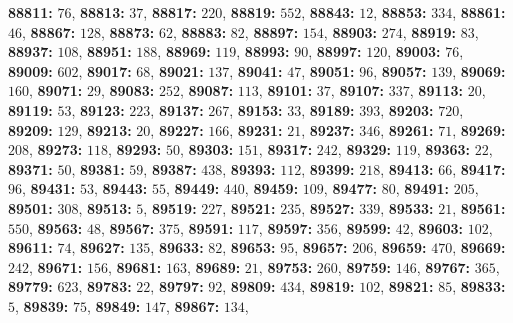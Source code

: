 \textsf{\bfseries 88811:} $76$, \textsf{\bfseries 88813:} $37$, \textsf{\bfseries 88817:} $220$, \textsf{\bfseries 88819:} $552$, \textsf{\bfseries 88843:} $12$, \textsf{\bfseries 88853:} $334$, \textsf{\bfseries 88861:} $46$, \textsf{\bfseries 88867:} $128$, \textsf{\bfseries 88873:} $62$, \textsf{\bfseries 88883:} $82$, \textsf{\bfseries 88897:} $154$, \textsf{\bfseries 88903:} $274$, \textsf{\bfseries 88919:} $83$, \textsf{\bfseries 88937:} $108$, \textsf{\bfseries 88951:} $188$, \textsf{\bfseries 88969:} $119$, \textsf{\bfseries 88993:} $90$, \textsf{\bfseries 88997:} $120$, \textsf{\bfseries 89003:} $76$, \textsf{\bfseries 89009:} $602$, \textsf{\bfseries 89017:} $68$, \textsf{\bfseries 89021:} $137$, \textsf{\bfseries 89041:} $47$, \textsf{\bfseries 89051:} $96$, \textsf{\bfseries 89057:} $139$, \textsf{\bfseries 89069:} $160$, \textsf{\bfseries 89071:} $29$, \textsf{\bfseries 89083:} $252$, \textsf{\bfseries 89087:} $113$, \textsf{\bfseries 89101:} $37$, \textsf{\bfseries 89107:} $337$, \textsf{\bfseries 89113:} $20$, \textsf{\bfseries 89119:} $53$, \textsf{\bfseries 89123:} $223$, \textsf{\bfseries 89137:} $267$, \textsf{\bfseries 89153:} $33$, \textsf{\bfseries 89189:} $393$, \textsf{\bfseries 89203:} $720$, \textsf{\bfseries 89209:} $129$, \textsf{\bfseries 89213:} $20$, \textsf{\bfseries 89227:} $166$, \textsf{\bfseries 89231:} $21$, \textsf{\bfseries 89237:} $346$, \textsf{\bfseries 89261:} $71$, \textsf{\bfseries 89269:} $208$, \textsf{\bfseries 89273:} $118$, \textsf{\bfseries 89293:} $50$, \textsf{\bfseries 89303:} $151$, \textsf{\bfseries 89317:} $242$, \textsf{\bfseries 89329:} $119$, \textsf{\bfseries 89363:} $22$, \textsf{\bfseries 89371:} $50$, \textsf{\bfseries 89381:} $59$, \textsf{\bfseries 89387:} $438$, \textsf{\bfseries 89393:} $112$, \textsf{\bfseries 89399:} $218$, \textsf{\bfseries 89413:} $66$, \textsf{\bfseries 89417:} $96$, \textsf{\bfseries 89431:} $53$, \textsf{\bfseries 89443:} $55$, \textsf{\bfseries 89449:} $440$, \textsf{\bfseries 89459:} $109$, \textsf{\bfseries 89477:} $80$, \textsf{\bfseries 89491:} $205$, \textsf{\bfseries 89501:} $308$, \textsf{\bfseries 89513:} $5$, \textsf{\bfseries 89519:} $227$, \textsf{\bfseries 89521:} $235$, \textsf{\bfseries 89527:} $339$, \textsf{\bfseries 89533:} $21$, \textsf{\bfseries 89561:} $550$, \textsf{\bfseries 89563:} $48$, \textsf{\bfseries 89567:} $375$, \textsf{\bfseries 89591:} $117$, \textsf{\bfseries 89597:} $356$, \textsf{\bfseries 89599:} $42$, \textsf{\bfseries 89603:} $102$, \textsf{\bfseries 89611:} $74$, \textsf{\bfseries 89627:} $135$, \textsf{\bfseries 89633:} $82$, \textsf{\bfseries 89653:} $95$, \textsf{\bfseries 89657:} $206$, \textsf{\bfseries 89659:} $470$, \textsf{\bfseries 89669:} $242$, \textsf{\bfseries 89671:} $156$, \textsf{\bfseries 89681:} $163$, \textsf{\bfseries 89689:} $21$, \textsf{\bfseries 89753:} $260$, \textsf{\bfseries 89759:} $146$, \textsf{\bfseries 89767:} $365$, \textsf{\bfseries 89779:} $623$, \textsf{\bfseries 89783:} $22$, \textsf{\bfseries 89797:} $92$, \textsf{\bfseries 89809:} $434$, \textsf{\bfseries 89819:} $102$, \textsf{\bfseries 89821:} $85$, \textsf{\bfseries 89833:} $5$, \textsf{\bfseries 89839:} $75$, \textsf{\bfseries 89849:} $147$, \textsf{\bfseries 89867:} $134$, 
